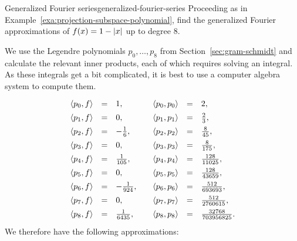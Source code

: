 \begin{example}{Generalized Fourier series}{generalized-fourier-series}
  Proceeding as in Example~\ref{exa:projection-subspace-polynomial},
  find the generalized Fourier approximations of $f(x)=1-\left|x\right|$ up
  to degree 8.
\end{example}

\begin{solution}
  We use the Legendre polynomials $p_0,\ldots,p_8$ from
  Section~\ref{sec:gram-schmidt} and calculate the relevant inner
  products, each of which requires solving an integral. As these
  integrals get a bit complicated, it is best to use a computer
  algebra system to compute them.
  \begin{equation*}
    \def\arraystretch{1.4}
    \begin{array}{rcl}
      \iprod{p_0,f} &=& 1, \\
      \iprod{p_1,f} &=& 0, \\
      \iprod{p_2,f} &=& -\frac{1}{6}, \\
      \iprod{p_3,f} &=& 0, \\
      \iprod{p_4,f} &=& \frac{1}{105}, \\
      \iprod{p_5,f} &=& 0, \\
      \iprod{p_6,f} &=& -\frac{1}{924}, \\
      \iprod{p_7,f} &=& 0, \\
      \iprod{p_8,f} &=& \frac{1}{6435}, \\
    \end{array}
    \quad
    \begin{array}{rcl}
      \iprod{p_0,p_0} &=& 2, \\
      \iprod{p_1,p_1} &=& \frac{2}{3}, \\
      \iprod{p_2,p_2} &=& \frac{8}{45}, \\
      \iprod{p_3,p_3} &=& \frac{8}{175}, \\
      \iprod{p_4,p_4} &=& \frac{128}{11025}, \\
      \iprod{p_5,p_5} &=& \frac{128}{43659}, \\
      \iprod{p_6,p_6} &=& \frac{512}{693693}, \\
      \iprod{p_7,p_7} &=& \frac{512}{2760615}, \\
      \iprod{p_8,p_8} &=& \frac{32768}{703956825}. \\
    \end{array}
  \end{equation*}
  We therefore have the following approximations:
  \begin{eqnarray*}

\end{eqnarray*}
\end{solution}
